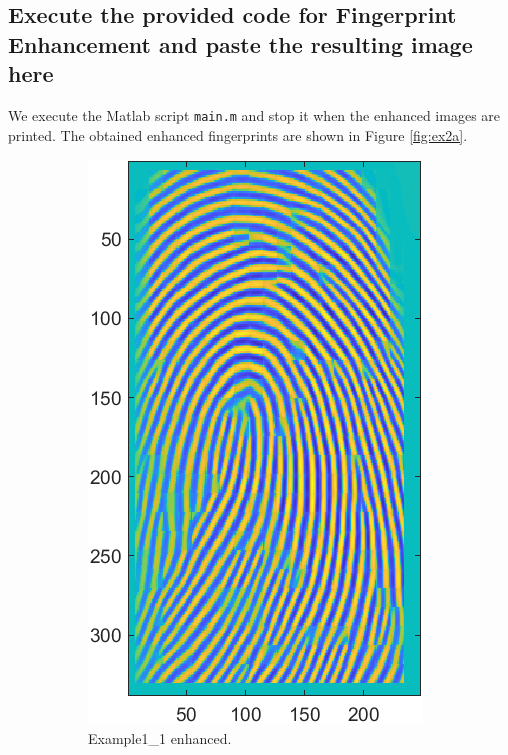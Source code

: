 \documentclass[a4paper]{article}
\def\inline{\lstinline[basicstyle=\ttfamily,keywordstyle={}]}
\begin{document}
\subsection{ Execute the provided code for Fingerprint Enhancement and paste the resulting image here}

We execute the Matlab script \inline{main.m} and stop it when the enhanced images are printed. The obtained enhanced fingerprints are shown in Figure \ref{fig:ex2a}.



\begin{figure}[H]
  \centering
       \begin{subfigure}[t]{0.45\textwidth}
         \centering
         \includegraphics[scale=0.6]{Figures/Enhanced1}
         \caption{Example1\_1 enhanced.}
     \end{subfigure}%
     \quad
     \begin{subfigure}[t]{0.45\textwidth}
         \centering

\end{subfigure}
\end{figure}
\end{document}
